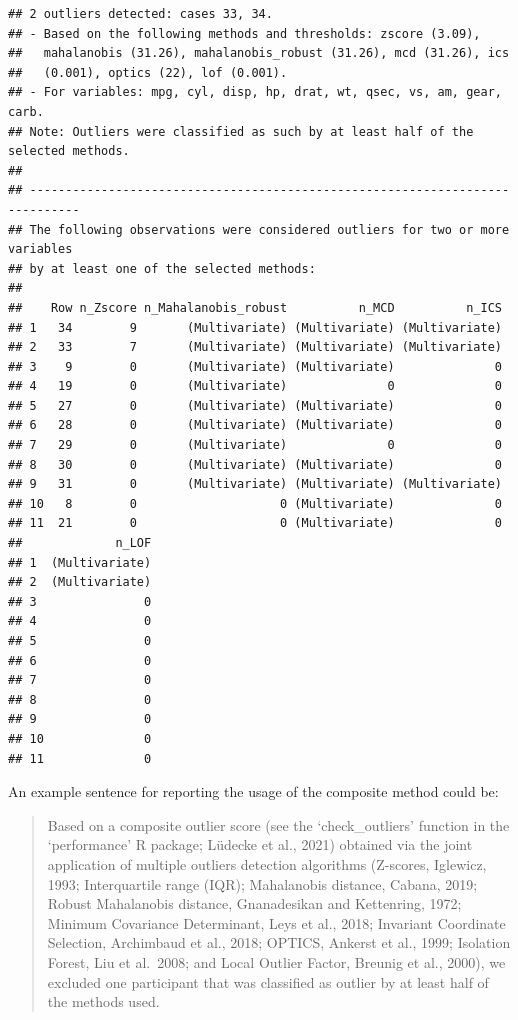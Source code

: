 \documentclass[
]{article}
\begin{document}
\begin{verbatim}
## 2 outliers detected: cases 33, 34.
## - Based on the following methods and thresholds: zscore (3.09),
##   mahalanobis (31.26), mahalanobis_robust (31.26), mcd (31.26), ics
##   (0.001), optics (22), lof (0.001).
## - For variables: mpg, cyl, disp, hp, drat, wt, qsec, vs, am, gear, carb.
## Note: Outliers were classified as such by at least half of the selected methods. 
## 
## -----------------------------------------------------------------------------
## The following observations were considered outliers for two or more variables 
## by at least one of the selected methods: 
## 
##    Row n_Zscore n_Mahalanobis_robust          n_MCD          n_ICS
## 1   34        9       (Multivariate) (Multivariate) (Multivariate)
## 2   33        7       (Multivariate) (Multivariate) (Multivariate)
## 3    9        0       (Multivariate) (Multivariate)              0
## 4   19        0       (Multivariate)              0              0
## 5   27        0       (Multivariate) (Multivariate)              0
## 6   28        0       (Multivariate) (Multivariate)              0
## 7   29        0       (Multivariate)              0              0
## 8   30        0       (Multivariate) (Multivariate)              0
## 9   31        0       (Multivariate) (Multivariate) (Multivariate)
## 10   8        0                    0 (Multivariate)              0
## 11  21        0                    0 (Multivariate)              0
##             n_LOF
## 1  (Multivariate)
## 2  (Multivariate)
## 3               0
## 4               0
## 5               0
## 6               0
## 7               0
## 8               0
## 9               0
## 10              0
## 11              0
\end{verbatim}

An example sentence for reporting the usage of the composite method
could be:

\begin{quote}
Based on a composite outlier score (see the `check\_outliers' function
in the `performance' R package; Lüdecke et al., 2021) obtained via the
joint application of multiple outliers detection algorithms (Z-scores,
Iglewicz, 1993; Interquartile range (IQR); Mahalanobis distance, Cabana,
2019; Robust Mahalanobis distance, Gnanadesikan and Kettenring, 1972;
Minimum Covariance Determinant, Leys et al., 2018; Invariant Coordinate
Selection, Archimbaud et al., 2018; OPTICS, Ankerst et al., 1999;
Isolation Forest, Liu et al.~2008; and Local Outlier Factor, Breunig et
al., 2000), we excluded one participant that was classified as outlier
by at least half of the methods used.
\end{quote}
\end{document}
